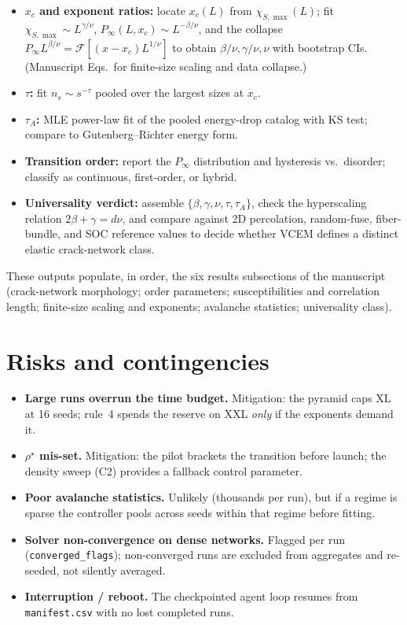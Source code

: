 \documentclass[11pt]{article}
\newcommand{\Pinf}{P_\infty}
\newcommand{\xc}{x_c}
\newcommand{\rhostar}{\rho^{\star}}
\begin{document}
\begin{itemize}
\item \textbf{$\xc$ and exponent ratios:} locate $x_c(L)$ from $\chi_{S,\max}(L)$;
fit $\chi_{S,\max}\sim L^{\gamma/\nu}$, $\Pinf(L,\xc)\sim L^{-\beta/\nu}$, and the
collapse $\Pinf L^{\beta/\nu}=\mathcal{F}[(x-\xc)L^{1/\nu}]$ to obtain
$\beta/\nu,\gamma/\nu,\nu$ with bootstrap CIs. (Manuscript Eqs.\ for finite-size
scaling and data collapse.)
\item \textbf{$\tau$:} fit $n_s\sim s^{-\tau}$ pooled over the largest sizes at $\xc$.
\item \textbf{$\tau_A$:} MLE power-law fit of the pooled energy-drop catalog with KS
test; compare to Gutenberg--Richter energy form.
\item \textbf{Transition order:} report the $\Pinf$ distribution and hysteresis vs.\
disorder; classify as continuous, first-order, or hybrid.
\item \textbf{Universality verdict:} assemble $\{\beta,\gamma,\nu,\tau,\tau_A\}$, check
the hyperscaling relation $2\beta+\gamma=d\nu$, and compare against 2D percolation,
random-fuse, fiber-bundle, and SOC reference values to decide whether VCEM defines a
distinct elastic crack-network class.
\end{itemize}

These outputs populate, in order, the six results subsections of the manuscript
(crack-network morphology; order parameters; susceptibilities and correlation length;
finite-size scaling and exponents; avalanche statistics; universality class).

\section{Risks and contingencies}
\label{sec:risks}

\begin{itemize}
\item \textbf{Large runs overrun the time budget.} Mitigation: the pyramid caps XL at
16 seeds; rule~4 spends the reserve on XXL \emph{only} if the exponents demand it.
\item \textbf{$\rhostar$ mis-set.} Mitigation: the pilot brackets the transition before
launch; the density sweep (C2) provides a fallback control parameter.
\item \textbf{Poor avalanche statistics.} Unlikely (thousands per run), but if a regime
is sparse the controller pools across seeds within that regime before fitting.
\item \textbf{Solver non-convergence on dense networks.} Flagged per run
(\texttt{converged\_flags}); non-converged runs are excluded from aggregates and
re-seeded, not silently averaged.
\item \textbf{Interruption / reboot.} The checkpointed agent loop resumes from
\texttt{manifest.csv} with no lost completed runs.
\end{itemize}
\end{document}
